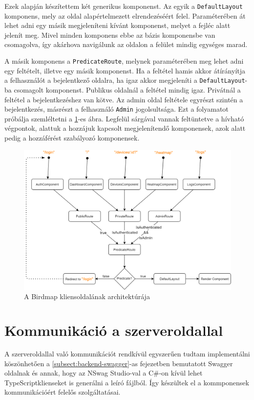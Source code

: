 Ezek alapján készítettem két generikus komponenst. Az egyik a \verb+DefaultLayout+ komponens, mely az oldal alapértelmezett elrendezéséért felel.
Paraméterében át lehet adni egy másik megjeleníteni kívánt komponenst, melyet a fejléc alatt jelenít meg.
Mivel minden komponens ebbe az bázis komponensbe van csomagolva, így akárhova navigálunk az oldalon a felület mindig egységes marad.

A másik komponens a \verb+PredicateRoute+, melynek paraméterében meg lehet adni egy feltételt, illetve egy másik komponenst.
Ha a feltétel hamis akkor átírányítja a felhasználót a bejelentkező oldalra, ha igaz akkor megjeleníti a \verb+DefaultLayout+-ba csomagolt komponenst.
Publikus oldalnál a feltétel mindig igaz. 
Privátnál a feltétel a bejelentkezéshez van kötve. 
Az admin oldal feltétele egyrészt szintén a bejelentkezés, másrészt a felhasználó \verb+Admin+ jogolsultsága.
Ezt a folyamatot próbálja szemléltetni a \ref{fig:birdmap-frontend-architecture}-es ábra. 
Legfelül sárgával vannak feltüntetve a hívható végpontok, alattuk a hozzájuk kapcsolt megjelenítendő komponensek, azok alatt pedig a hozzáférést szabályozó komponensek.

\begin{figure}[!ht]
    \centering
    \includegraphics[width=150mm, keepaspectratio]{figures/birdmap-frontend-routes.png}
    \caption{A Birdmap kliensoldalának architektúrája}
    \label{fig:birdmap-frontend-architecture}
\end{figure}

\section{Kommunikáció a szerveroldallal}
A szerveroldallal való kommunikációt rendkívül egyszerűen tudtam implementálni köszönhetően a \ref{subsect:backend-swagger}-as fejezetben bemutatott Swagger oldalnak
és annak, hogy az NSwag Studio-val \cite{nswag-studio} a C\#-on kívül lehet TypeScript\footnotemark klienseket is generálni a leíró fájlból.
Így készültek el a kommponensek kommunikációért felelős szolgáltatásai.

